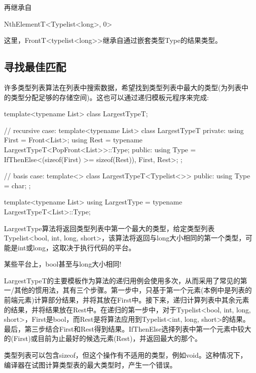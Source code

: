 再继承自

\begin{cpp}
NthElementT<Typelist<long>, 0>
\end{cpp}

这里，FrontT<typelist<long>{}>继承自通过嵌套类型Type的结果类型。

\subsection{寻找最佳匹配}

许多类型列表算法在列表中搜索数据，希望找到类型列表中最大的类型(为列表中的类型分配足够的存储空间)。这也可以通过递归模板元程序来完成:

\begin{cpp}
template<typename List>
class LargestTypeT;

// recursive case:
template<typename List>
class LargestTypeT
{
	private:
	using First = Front<List>;
	using Rest = typename LargestTypeT<PopFront<List>>::Type;
	public:
	using Type = IfThenElse<(sizeof(First) >= sizeof(Rest)), First, Rest>;
};

// basis case:
template<>
class LargestTypeT<Typelist<>>
{
	public:
	using Type = char;
};

template<typename List>
using LargestType = typename LargestTypeT<List>::Type;
\end{cpp}

LargestType算法将返回类型列表中第一个最大的类型，给定类型列表Typelist<bool, int, long, short>，该算法将返回与long大小相同的第一个类型，可能是int或long，这取决于执行代码的平台。

\begin{notice}某些平台上，bool甚至与long大小相同!
\end{notice}

LargestTypeT的主要模板作为算法的递归用例会使用多次，从而采用了常见的第一/其他的惯用法，其有三个步骤。第一步中，只基于第一个元素(本例中是列表的前端元素)计算部分结果，并将其放在First中。接下来，递归计算列表中其余元素的结果，并将结果放在Rest中。在递归的第一步中，对于Typelist<bool, int, long, short>，First是bool，而Rest是将算法应用到Typelist<int, long, short>的结果。最后，第三步结合First和Rest得到结果。IfThenElse选择列表中第一个元素中较大的(First)或目前为止最好的候选元素(Rest)，并返回最大的那个。

\begin{notice}类型列表可以包含sizeof，但这个操作有不适用的类型，例如void。这种情况下，编译器在试图计算类型表的最大类型时，产生一个错误。
\end{notice}

